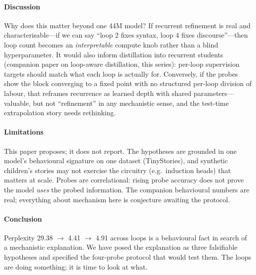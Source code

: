 \paragraph{Discussion}

Why does this matter beyond one 44M model? If recurrent refinement
is real and characterisable---if we can say ``loop 2 fixes syntax,
loop 4 fixes discourse''---then loop count becomes an
\emph{interpretable} compute knob rather than a blind
hyperparameter. It would also inform distillation into recurrent
students (companion paper on loop-aware distillation, this series):
per-loop supervision targets should match what each loop is actually
for. Conversely, if the probes show the block converging to a fixed
point with no structured per-loop division of labour, that reframes
recurrence as learned depth with shared parameters---valuable, but
not ``refinement'' in any mechanistic sense, and the test-time
extrapolation story needs rethinking.

\paragraph{Limitations}

This paper proposes; it does not report. The hypotheses are grounded
in one model's behavioural signature on one dataset (TinyStories),
and synthetic children's stories may not exercise the circuitry
(e.g.\ induction heads) that matters at scale. Probes are
correlational: rising probe accuracy does not prove the model
\emph{uses} the probed information. The companion behavioural numbers
are real; everything about mechanism here is conjecture awaiting the
protocol.

\paragraph{Conclusion}

Perplexity 29.38 $\rightarrow$ 4.41 $\rightarrow$ 4.91 across loops is
a behavioural fact in search of a mechanistic explanation. We have
posed the explanation as three falsifiable hypotheses and specified
the four-probe protocol that would test them. The loops are doing
something; it is time to look at what.
